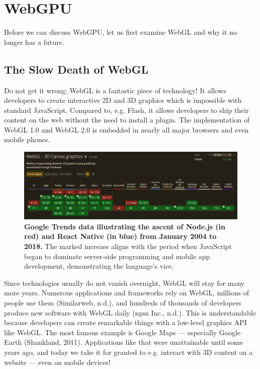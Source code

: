 \documentclass[10pt]{article}
\begin{document}
\begin{sloppypar}
  \section{WebGPU}
  \label{sec:webgpu}

  Before we can discuss WebGPU, let us first examine WebGL and why it no longer has a future.

  \subsection{The Slow Death of WebGL}
  \label{subsec:the-slow-death-of-webgl}

  Do not get it wrong; WebGL is a fantastic piece of technology! It allows developers to create interactive 2D and 3D graphics which is impossible with standard JavaScript. Compared to, e.g. Flash, it allows developers to ship their content on the web without the need to install a plugin. The implementation of WebGL 1.0 and WebGL 2.0 is embedded in nearly all major browsers and even mobile phones.

  \begin{figure}[ht]
    \centering
    \includegraphics[width=\textwidth]{figures/can-i-use.png}
    \caption[Google Trends data illustrating the ascent of Node.js and React Native.]{\textbf{Google Trends data illustrating the ascent of Node.js (in red) and React Native (in blue) from January 2004 to 2018.} The marked increase aligns with the period when JavaScript began to dominate server-side programming and mobile app development, demonstrating the language’s vice.}
    \label{fig:can-i-use}
  \end{figure}

  Since technologies usually do not vanish overnight, WebGL will stay for many more years. Numerous applications and frameworks rely on WebGL, millions of people use them (Similarweb, n.d.), and hundreds of thousands of developers produce new software with WebGL daily (npm Inc., n.d.). This is understandable because developers can create remarkable things with a low-level graphics API like WebGL. The most famous example is Google Maps — especially Google Earth (Shankland, 2011). Applications like that were unattainable until some years ago, and today we take it for granted to e.g. interact with 3D content on a website — even on mobile devices!


\end{sloppypar}
\end{document}

